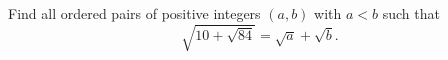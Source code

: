 Find all ordered pairs of positive integers $(a,b)$ with $a<b$ such that
\[\sqrt{10+\sqrt{84}}=\sqrt a+\sqrt b .\]
